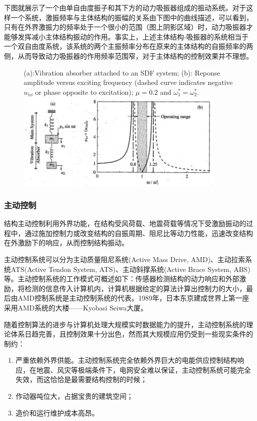 下图就展示了一个由单自由度振子和其下方的动力吸振器组成的振动系统。对于这样一个系统，激振频率与主体结构的振幅的关系由下图中的曲线描述，可以看到，只有在外界激振力的频率处于一个很小的范围（图上阴影区域）时，动力吸振器才能够发挥减小主体结构振动的作用。事实上，上述主体结构-吸振器的系统相当于一个双自由度系统，该系统的两个主振频率分布在原来的主体结构的自振频率的两侧，从而导致动力吸振器的作用频率范围窄，对于主体结构的控制效果并不理想。

\begin{figure}[H]
	\centering
		{(a):Vibration absorber attached to an SDF system; (b): Reponse amplitude versus exciting frequency (dashed curve indicates negative $u_{1o}$ or phase opposite to excitation); $\mu=0.2$ and $\omega_1^*=\omega_2^*$.}
	\label{double}
	\includegraphics[width=4in]{figure/double}
\end{figure}


\subsubsection{主动控制}
结构主动控制利用外界功能，在结构受风荷载、地震荷载等情况下受激励振动的过程中，通过施加控制力或改变结构的自振周期、阻尼比等动力性能，迅速改变结构在外激励下的响应，从而控制结构振动。

主动控制系统可以分为主动质量阻尼系统(Active Mass Drive, AMD)、主动拉索系统ATS(Active Tendon System, ATS)、主动斜撑系统(Active Brace System, ABS)等。主动控制系统的工作模式可概述如下：传感器检测结构的动力响应和外部激励，将检测的信息传入计算机内，计算机根据给定的算法计算出控制力的大小，最后由AMD控制系统是主动控制系统的代表。1989年，日本东京建成世界上第一座采用AMD系统的大楼——Kyobasi Seiwa大厦\cite{T.KoboriN.KoshikaN.Yamada1991}。

随着控制算法的进步与计算机处理大规模实时数据能力的提升，主动控制系统的理论体系日趋完善，且控制效果十分出色，然而其大规模应用仍受到一些现实条件的制约：
\begin{enumerate}
	\item 严重依赖外界供能。主动控制系统完全依赖外界巨大的电能供应控制结构响应，在地震、风灾等极端条件下，电网安全难以保证，主动控制系统可能完全失效，而这恰恰是最需要结构控制的时候；
	\item 作动器吨位大，占据宝贵的建筑空间\cite{lou2013}；
	\item 造价和运行维护成本高昂。
\end{enumerate}

